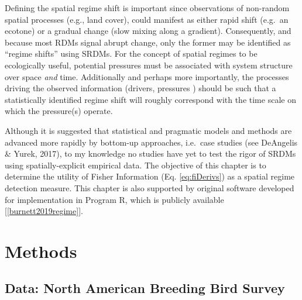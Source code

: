 \documentclass[12pt,twoside,openany]{reedthesis}
\begin{document}
Defining the spatial regime shift is important since observations of
non-random spatial processes (e.g., land cover), could manifest as
either rapid shift (e.g.~an ecotone) or a gradual change (slow mixing
along a gradient). Consequently, and because most RDMs signal abrupt
change, only the former may be identified as ``regime shifts'' using
SRDMs. For the concept of spatial regimes to be ecologically useful,
potential pressures must be associated with system structure over space
\emph{and} time. Additionally and perhaps more importantly, the
processes driving the observed information (drivers, pressures ) should
be such that a statistically identified regime shift will roughly
correspond with the time scale on which the pressure(s) operate.

Although it is suggested that statistical and pragmatic models and
methods are advanced more rapidly by bottom-up approaches, i.e.~case
studies (see DeAngelis \& Yurek, 2017), to my knowledge no studies have
yet to test the rigor of SRDMs using spatially-explicit empirical data.
The objective of this chapter is to determine the utility of Fisher
Information (Eq. \eqref{eq:fiDerivs}) as a spatial regime detection
measure. This chapter is also supported by original software developed
for implementation in Program R, which is publicly available
{[}\ref{burnett2019regime}{]}.

\section{Methods}\label{methods-1}

\subsection{Data: North American Breeding Bird
Survey}\label{data-north-american-breeding-bird-survey}
\end{document}
